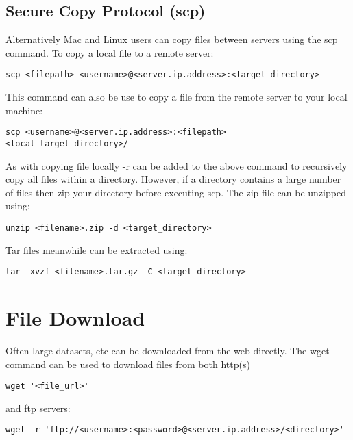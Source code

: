 \documentclass[
]{book}
\begin{document}
\hypertarget{secure-copy-protocol-scp}{%
\subsection{Secure Copy Protocol (scp)}\label{secure-copy-protocol-scp}}

Alternatively Mac and Linux users can copy files between servers using the scp command.
To copy a local file to a remote server:

\begin{verbatim}
scp <filepath> <username>@<server.ip.address>:<target_directory>
\end{verbatim}

This command can also be use to copy a file from the remote server to your local machine:

\begin{verbatim}
scp <username>@<server.ip.address>:<filepath> <local_target_directory>/
\end{verbatim}

As with copying file locally -r can be added to the above command to recursively copy
all files within a directory. However, if a directory contains a large number of files
then zip your directory before executing scp. The zip file can be unzipped using:

\begin{verbatim}
unzip <filename>.zip -d <target_directory>
\end{verbatim}

Tar files meanwhile can be extracted using:

\begin{verbatim}
tar -xvzf <filename>.tar.gz -C <target_directory>
\end{verbatim}

\hypertarget{file-download}{%
\section{File Download}\label{file-download}}

Often large datasets, etc can be downloaded from the web directly.
The wget command can be used to download files from both http(s)

\begin{verbatim}
wget '<file_url>'
\end{verbatim}

and ftp servers:

\begin{verbatim}
wget -r 'ftp://<username>:<password>@<server.ip.address>/<directory>'
\end{verbatim}
\end{document}

